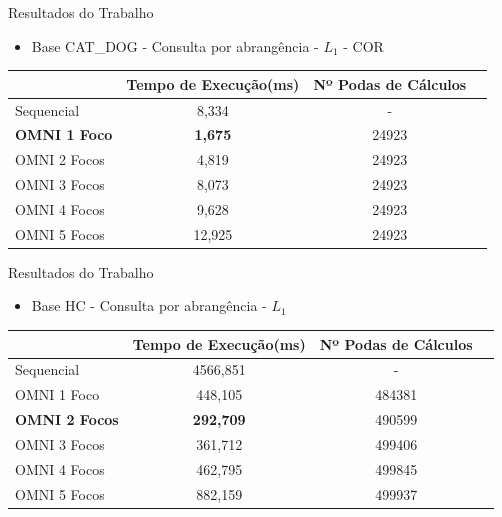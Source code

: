 \documentclass{beamer}
\begin{document}
\begin{frame}{Resultados do Trabalho}
 \begin{itemize}
  \item Base CAT\_DOG - Consulta por abrangência - $L_1$ - COR
 \end{itemize}
  
  \begin{table}[H]
    \centering
   \begin{tabular}{l c c c}
            &Tempo de Execução(ms)&Nº Podas de Cálculos\\ \hline
            Sequencial & 8,334 & - \\
            \textbf{OMNI 1 Foco} & \textbf{1,675} & 24923 \\
            OMNI 2 Focos & 4,819 & 24923 \\
            OMNI 3 Focos & 8,073 & 24923 \\
            OMNI 4 Focos & 9,628 & 24923 \\
            OMNI 5 Focos & 12,925 & 24923 \\ \hline
    \end{tabular}
\end{table}
  
\end{frame}

\begin{frame}{Resultados do Trabalho}
 \begin{itemize}
  \item Base HC - Consulta por abrangência - $L_1$
 \end{itemize}
  
  \begin{table}[H]
    \centering
   \begin{tabular}{l c c c}
            &Tempo de Execução(ms)&Nº Podas de Cálculos\\ \hline
            Sequencial & 4566,851 & - \\
            OMNI 1 Foco & 448,105 & 484381 \\
            \textbf{OMNI 2 Focos} & \textbf{292,709} & 490599 \\
            OMNI 3 Focos & 361,712& 499406 \\
            OMNI 4 Focos & 462,795 & 499845 \\
            OMNI 5 Focos & 882,159 & 499937 \\ \hline
    \end{tabular}
\end{table}
  
\end{frame}
\end{document}
